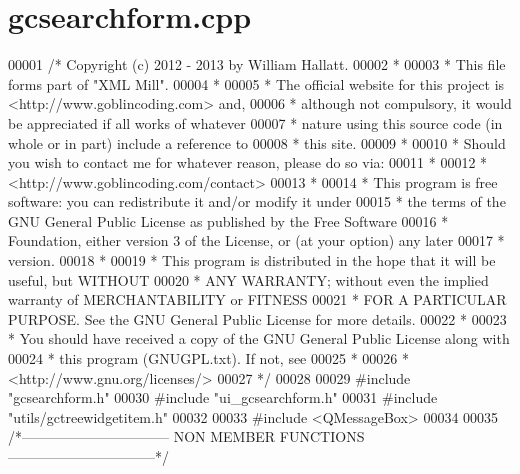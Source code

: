 \hypertarget{gcsearchform_8cpp_source}{\section{gcsearchform.\-cpp}
}

\begin{DoxyCode}
00001 \textcolor{comment}{/* Copyright (c) 2012 - 2013 by William Hallatt.}
00002 \textcolor{comment}{ *}
00003 \textcolor{comment}{ * This file forms part of "XML Mill".}
00004 \textcolor{comment}{ *}
00005 \textcolor{comment}{ * The official website for this project is <http://www.goblincoding.com> and,}
00006 \textcolor{comment}{ * although not compulsory, it would be appreciated if all works of whatever}
00007 \textcolor{comment}{ * nature using this source code (in whole or in part) include a reference to}
00008 \textcolor{comment}{ * this site.}
00009 \textcolor{comment}{ *}
00010 \textcolor{comment}{ * Should you wish to contact me for whatever reason, please do so via:}
00011 \textcolor{comment}{ *}
00012 \textcolor{comment}{ *                 <http://www.goblincoding.com/contact>}
00013 \textcolor{comment}{ *}
00014 \textcolor{comment}{ * This program is free software: you can redistribute it and/or modify it
       under}
00015 \textcolor{comment}{ * the terms of the GNU General Public License as published by the Free
       Software}
00016 \textcolor{comment}{ * Foundation, either version 3 of the License, or (at your option) any later}
00017 \textcolor{comment}{ * version.}
00018 \textcolor{comment}{ *}
00019 \textcolor{comment}{ * This program is distributed in the hope that it will be useful, but WITHOUT}
00020 \textcolor{comment}{ * ANY WARRANTY; without even the implied warranty of MERCHANTABILITY or
       FITNESS}
00021 \textcolor{comment}{ * FOR A PARTICULAR PURPOSE.  See the GNU General Public License for more
       details.}
00022 \textcolor{comment}{ *}
00023 \textcolor{comment}{ * You should have received a copy of the GNU General Public License along with}
00024 \textcolor{comment}{ * this program (GNUGPL.txt).  If not, see}
00025 \textcolor{comment}{ *}
00026 \textcolor{comment}{ *                    <http://www.gnu.org/licenses/>}
00027 \textcolor{comment}{ */}
00028 
00029 \textcolor{preprocessor}{#include "gcsearchform.h"}
00030 \textcolor{preprocessor}{#include "ui\_gcsearchform.h"}
00031 \textcolor{preprocessor}{#include "utils/gctreewidgetitem.h"}
00032 
00033 \textcolor{preprocessor}{#include <QMessageBox>}
00034 
00035 \textcolor{comment}{/*-------------------------------- NON MEMBER FUNCTIONS
       --------------------------------*/}

\end{DoxyCode}
